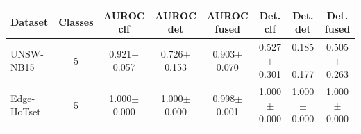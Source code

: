 \begin{tabular}{lccccccc}
\toprule
Dataset & Classes & AUROC clf & AUROC det & AUROC fused & Det. clf & Det. det & Det. fused \\
\midrule
UNSW-NB15 & 5 & 0.921$\pm$0.057 & 0.726$\pm$0.153 & 0.903$\pm$0.070 & 0.527$\pm$0.301 & 0.185$\pm$0.177 & 0.505$\pm$0.263 \\
Edge-IIoTset & 5 & 1.000$\pm$0.000 & 1.000$\pm$0.000 & 0.998$\pm$0.001 & 1.000$\pm$0.000 & 1.000$\pm$0.000 & 1.000$\pm$0.000 \\
\bottomrule
\end{tabular}
